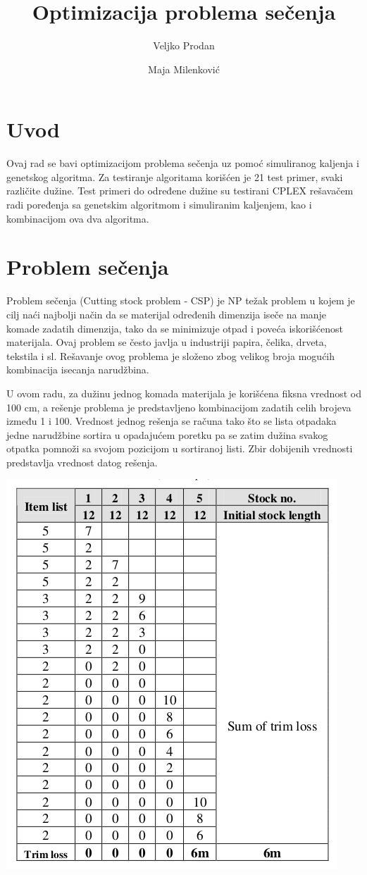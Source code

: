 \documentclass[12pt, a4paper]{article}
\title{Optimizacija problema sečenja}
\author{\small Veljko Prodan \and \small Maja Milenković}
\date{}
\begin{document}
\maketitle


\section{Uvod}
Ovaj rad se bavi optimizacijom problema sečenja uz pomoć simuliranog kaljenja i genetskog algoritma. Za testiranje algoritama korišćen je 21 test primer, svaki različite dužine. Test primeri do određene dužine su testirani CPLEX rešavačem radi poređenja sa genetskim algoritmom i simuliranim kaljenjem, kao i kombinacijom ova dva algoritma.

\section{Problem sečenja}
Problem sečenja (Cutting stock problem - CSP) je NP težak problem u kojem je cilj naći najbolji način da se materijal određenih dimenzija iseče na manje komade zadatih dimenzija, tako da se minimizuje otpad i poveća iskorišćenost materijala. Ovaj problem se često javlja u industriji papira, čelika, drveta, tekstila i sl. Rešavanje ovog problema je složeno zbog velikog broja mogućih kombinacija isecanja narudžbina.

U ovom radu, za dužinu jednog komada materijala je korišćena fiksna vrednost od 100 cm, a rešenje problema je predstavljeno kombinacijom zadatih celih brojeva između 1 i 100. Vrednost jednog rešenja se računa tako što se lista otpadaka jedne narudžbine sortira u opadajućem poretku pa se zatim dužina svakog otpatka pomnoži sa svojom pozicijom u sortiranoj listi. Zbir dobijenih vrednosti predstavlja vrednost datog rešenja. \\

\begin{minipage}{\linewidth}
    \centering
    \includegraphics[width=0.5\linewidth]{img/predstavak_resenja.png}
\end{minipage}
\end{document}

